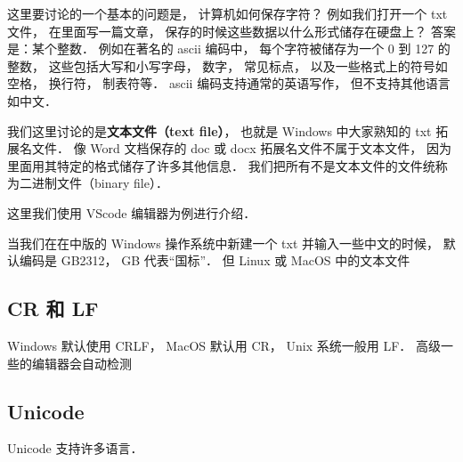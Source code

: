 
这里要讨论的一个基本的问题是， 计算机如何保存字符？ 例如我们打开一个 txt 文件， 在里面写一篇文章， 保存的时候这些数据以什么形式储存在硬盘上？ 答案是：某个整数． 例如在著名的 ascii 编码中， 每个字符被储存为一个 0 到 127 的整数， 这些包括大写和小写字母， 数字， 常见标点， 以及一些格式上的符号如空格， 换行符， 制表符等． ascii 编码支持通常的英语写作， 但不支持其他语言如中文．

我们这里讨论的是\textbf{文本文件（text file）}， 也就是 Windows 中大家熟知的 txt 拓展名文件． 像 Word 文档保存的 doc 或 docx 拓展名文件不属于文本文件， 因为里面用其特定的格式储存了许多其他信息． 我们把所有不是文本文件的文件统称为二进制文件（binary file）．

这里我们使用 VScode 编辑器为例进行介绍． 

当我们在在中版的 Windows 操作系统中新建一个 txt 并输入一些中文的时候， 默认编码是 GB2312， GB 代表“国标”． 但 Linux 或 MacOS 中的文本文件

\subsection{CR 和 LF}
Windows 默认使用 CRLF， MacOS 默认用 CR， Unix 系统一般用 LF． 高级一些的编辑器会自动检测

\subsection{Unicode}
Unicode 支持许多语言．
